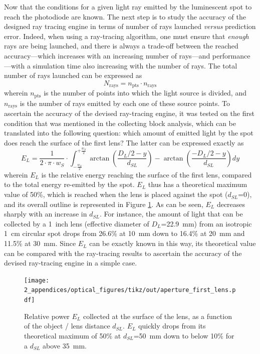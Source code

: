 Now that the conditions for a given light ray emitted by the luminescent spot to reach the photodiode are known. The next step is to study the accuracy of the designed ray tracing engine in terms of number of rays launched \textit{versus} prediction error. Indeed, when using a ray-tracing algorithm, one must ensure that \emph{enough} rays are being launched, and there is always a trade-off between the reached accuracy---which increases with an increasing number of rays---and performance---with a simulation time also increasing with the number of rays. The total number of rays launched can be expressed as
\begin{equation}
	N_\mathrm{rays} = n_\mathrm{pts} \cdot n_\mathrm{rays}
\end{equation}
wherein $n_\mathrm{pts}$ is the number of points into which the light source is divided, and $n_\mathrm{rays}$ is the number of rays emitted by each one of these source points. To ascertain the accuracy of the devised ray-tracing engine, it was tested on the first condition that was mentioned in the collecting block analysis, which can be translated into the following question: which amount of emitted light by the spot does reach the surface of the first lens? The latter can be expressed exactly as
\begin{equation}
	E_L = \frac{1}{2\cdot \pi \cdot w_S} \cdot \int_{-\frac{w_S}{2}}^{+\frac{w_S}{2}} \arctan \left( \frac{D_L / 2 - y}{d_{SL}} \right) - \arctan \left( \frac{-D_L / 2 - y}{d_{SL}} \right) dy
\end{equation}
wherein $E_L$ is the relative energy reaching the surface of the first lens, compared to the total energy re-emitted by the spot. $E_L$ thus has a theoretical maximum value of 50\%, which is reached when the lens is placed against the spot ($d_{SL}$=0), and its overall outline is represented in Figure \ref{anfig:optics:exact_pc_dist}. As can be seen, $E_L$ decreases sharply with an increase in $d_{SL}$. For instance, the amount of light that can be collected by a 1~inch lens (effective diameter of $D_L$=22.9~mm) from an isotropic 1~cm circular spot drops from 26.6\% at 10~mm down to 16.4\% at 20~mm and 11.5\% at 30~mm. Since $E_L$ can be exactly known in this way, its theoretical value can be compared with the ray-tracing results to ascertain the accuracy of the devised ray-tracing engine in a simple case.

\begin{figure}
	\centering
	\texttt{[image: 2\_appendices/optical\_figures/tikz/out/aperture\_first\_lens.pdf]}
	\caption[Relative power $E_L$ collected at the surface of the lens, as a function of the object / lens distance $d_{SL}$.]{Relative power $E_L$ collected at the surface of the lens, as a function of the object / lens distance $d_{SL}$. $E_L$ quickly drops from its theoretical maximum of 50\% at $d_{SL}$=50~mm down to below 10\% for a $d_{SL}$ above 35~mm.}
	\label{anfig:optics:exact_pc_dist}
\end{figure}

